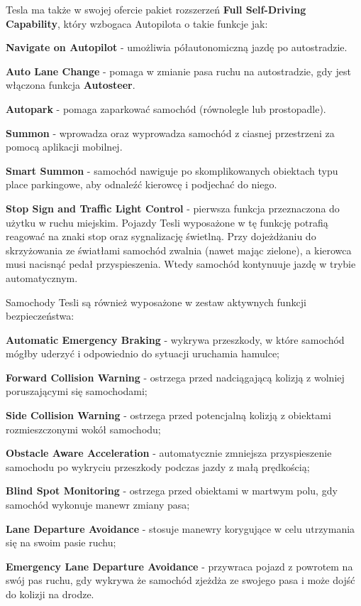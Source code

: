 Tesla ma także w swojej ofercie pakiet rozszerzeń \textbf{Full Self-Driving Capability}, który wzbogaca Autopilota o takie funkcje jak:
\vspace{-0.25cm}
\begin{enumerate*}
\item \textbf{Navigate on Autopilot} - umożliwia półautonomiczną jazdę po autostradzie.
\item \textbf{Auto Lane Change} - pomaga w zmianie pasa ruchu na autostradzie, gdy jest włączona funkcja \textbf{Autosteer}.
\item \textbf{Autopark} - pomaga zaparkować samochód (równolegle lub prostopadle).
\item \textbf{Summon} - wprowadza oraz wyprowadza samochód z ciasnej przestrzeni za pomocą aplikacji mobilnej.
\item \textbf{Smart Summon} - samochód nawiguje po skomplikowanych obiektach typu place parkingowe, aby odnaleźć kierowcę i podjechać do niego.
\item \textbf{Stop Sign and Traffic Light Control} - pierwsza funkcja przeznaczona do użytku w ruchu miejskim. Pojazdy Tesli wyposażone w tę funkcję potrafią reagować na znaki stop oraz sygnalizację świetlną. Przy dojeżdżaniu do skrzyżowania ze światłami samochód zwalnia (nawet mając zielone), a kierowca musi nacisnąć pedał przyspieszenia. Wtedy samochód kontynuuje jazdę w trybie automatycznym.
\end{enumerate*}

Samochody Tesli są również wyposażone w zestaw aktywnych funkcji bezpieczeństwa:
\vspace{-0.25cm}
\begin{enumerate*}
\item \textbf{Automatic Emergency Braking} - wykrywa przeszkody, w które samochód mógłby uderzyć i odpowiednio do sytuacji uruchamia hamulce;
\item \textbf{Forward Collision Warning} - ostrzega przed nadciągającą kolizją z wolniej poruszającymi się samochodami;
\item \textbf{Side Collision Warning} - ostrzega przed potencjalną kolizją z obiektami rozmieszczonymi wokół samochodu;
\item \textbf{Obstacle Aware Acceleration} - automatycznie zmniejsza przyspieszenie samochodu po wykryciu przeszkody podczas jazdy z małą prędkością;
\item \textbf{Blind Spot Monitoring} - ostrzega przed obiektami w martwym polu, gdy samochód wykonuje manewr zmiany pasa;
\item \textbf{Lane Departure Avoidance} - stosuje manewry korygujące w celu utrzymania się na swoim pasie ruchu;
\item \textbf{Emergency Lane Departure Avoidance} - przywraca pojazd z powrotem na swój pas ruchu, gdy wykrywa że samochód zjeżdża ze swojego pasa i może dojść do kolizji na drodze.
\end{enumerate*}

